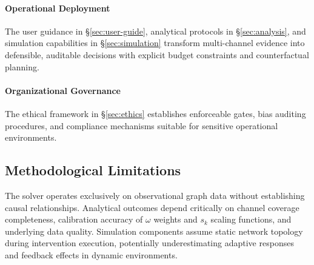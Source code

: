 \documentclass[12pt]{article}
\theoremstyle{plain}
\begin{document}
\paragraph{Operational Deployment}
The user guidance in §\ref{sec:user-guide}, analytical protocols in §\ref{sec:analysis}, and simulation capabilities in §\ref{sec:simulation} transform multi-channel evidence into defensible, auditable decisions with explicit budget constraints and counterfactual planning.

\paragraph{Organizational Governance}
The ethical framework in §\ref{sec:ethics} establishes enforceable gates, bias auditing procedures, and compliance mechanisms suitable for sensitive operational environments.

\subsection{Methodological Limitations}
The solver operates exclusively on observational graph data without establishing causal relationships. Analytical outcomes depend critically on channel coverage completeness, calibration accuracy of $\omega$ weights and $s_k$ scaling functions, and underlying data quality. Simulation components assume static network topology during intervention execution, potentially underestimating adaptive responses and feedback effects in dynamic environments.
\end{document}
